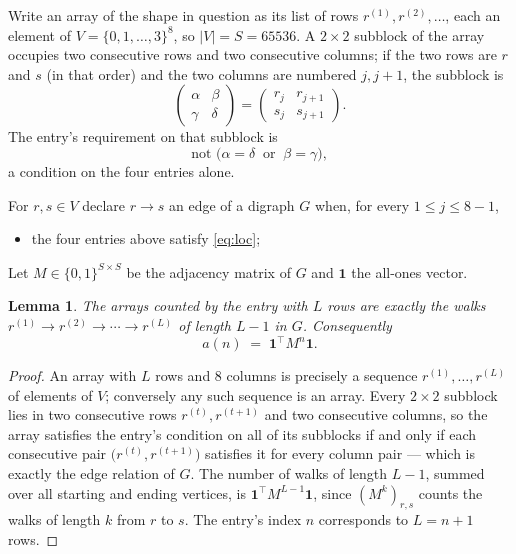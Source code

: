 \documentclass[11pt,a4paper]{article}
\theoremstyle{plain}
\newtheorem{lemma}[theorem]{Lemma}
\theoremstyle{definition}
\begin{document}
Write an array of the shape in question as its list of rows
$r^{(1)},r^{(2)},\dots$, each an element of
$V=\{0,1,\dots,3\}^{8}$, so $|V|=S=65536$. A $2\times2$ subblock of the array
occupies two consecutive rows and two consecutive columns; if the two rows are $r$
and $s$ (in that order) and the two columns are numbered $j,j+1$,
the subblock is
\[
\begin{pmatrix}\alpha&\beta\\\gamma&\delta\end{pmatrix}=\begin{pmatrix}r_j&r_{j+1}\\s_j&s_{j+1}\end{pmatrix}.
\]
The entry's requirement on that subblock is
\begin{equation}\label{eq:loc}
\text{not }\bigl(\alpha=\delta\ \text{ or }\ \beta=\gamma\bigr),
\end{equation}
a condition on the four entries alone.

For $r,s\in V$ declare $r\to s$ an edge of a digraph $G$ when, for every
$1\le j\le 8-1$,
\begin{itemize}
\item the four entries above satisfy \eqref{eq:loc};

\end{itemize}
Let $M\in\{0,1\}^{S\times S}$ be the adjacency matrix of $G$ and $\mathbf{1}$ the
all-ones vector.

\begin{lemma}\label{lem:walk}
The arrays counted by the entry with $L$ rows are exactly the walks
$r^{(1)}\to r^{(2)}\to\cdots\to r^{(L)}$ of length $L-1$ in $G$. Consequently
\[
a(n)\;=\;\mathbf{1}^{\!\top}M^{n}\mathbf{1} .
\]
\end{lemma}

\begin{proof}
An array with $L$ rows and $8$ columns is precisely a sequence
$r^{(1)},\dots,r^{(L)}$ of elements of $V$; conversely any such sequence is an array.
Every $2\times2$ subblock lies in two consecutive rows $r^{(t)},r^{(t+1)}$ and two
consecutive columns, so the array satisfies the entry's condition on all of its subblocks
if and only if each consecutive pair $\bigl(r^{(t)},r^{(t+1)}\bigr)$ satisfies it for
every column pair --- which is exactly the edge relation of $G$. The number of walks of
length $L-1$, summed over all starting and ending vertices, is
$\mathbf{1}^{\!\top}M^{L-1}\mathbf{1}$, since $(M^{k})_{r,s}$ counts the walks of
length $k$ from $r$ to $s$. The entry's index $n$ corresponds to $L=n+1$ rows.
\end{proof}
\end{document}

